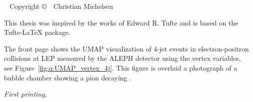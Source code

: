 
\newpage
\begin{fullwidth}
~\vfill
\thispagestyle{empty}
\setlength{\parindent}{0pt}
\setlength{\parskip}{\baselineskip}
Copyright \copyright\ \the\year\ \newline Christian Michelsen

\par{}


This thesis was inspired by the works of Edward R. Tufte and is based on the Tufte-\LaTeX\xspace package. 


\noindent The front page shows the UMAP visualization of 4-jet events in electron-positron collisions at LEP measured by the ALEPH detector using the vertex variables, see Figure~\ref{fig:q:UMAP_vertex_4j}. This figure is overlaid a photograph of a bubble chamber showing a pion decaying \autocite{desyBubbleChamberPhotograph}. 

\par\textit{First printing, \monthyear}
\end{fullwidth}